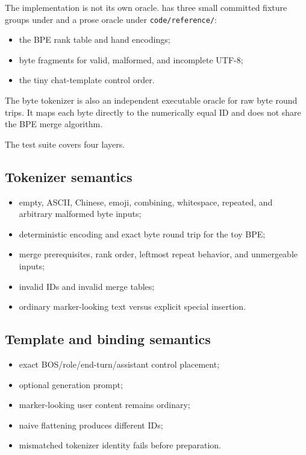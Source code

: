 The implementation is not its own oracle.  has three small
committed fixture groups under
\texttt{} and a prose
oracle under \texttt{code/reference/}:

\begin{itemize}
\tightlist
\item
  the BPE rank table and hand encodings;
\item
  byte fragments for valid, malformed, and incomplete UTF-8;
\item
  the tiny chat-template control order.
\end{itemize}

The byte tokenizer is also an independent executable oracle for raw byte
round trips. It maps each byte directly to the numerically equal ID and
does not share the BPE merge algorithm.

The test suite covers four layers.

\subsection{Tokenizer semantics}\label{tokenizer-semantics}

\begin{itemize}
\tightlist
\item
  empty, ASCII, Chinese, emoji, combining, whitespace, repeated, and
  arbitrary malformed byte inputs;
\item
  deterministic encoding and exact byte round trip for the toy BPE;
\item
  merge prerequisites, rank order, leftmost repeat behavior, and
  unmergeable inputs;
\item
  invalid IDs and invalid merge tables;
\item
  ordinary marker-looking text versus explicit special insertion.
\end{itemize}

\subsection{Template and binding
semantics}\label{template-and-binding-semantics}

\begin{itemize}
\tightlist
\item
  exact BOS/role/end-turn/assistant control placement;
\item
  optional generation prompt;
\item
  marker-looking user content remains ordinary;
\item
  naive flattening produces different IDs;
\item
  mismatched tokenizer identity fails before preparation.
\end{itemize}

